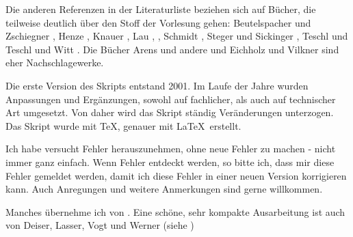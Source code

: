 Die anderen Referenzen in der Literaturliste beziehen sich auf Bücher, die 
teilweise deutlich über den Stoff der Vorlesung gehen: 
Beutelspacher und Zschiegner \cite{Beutelspacher.2002}, 
Henze \cite{Henze.2005}, 
Knauer \cite{Knauer.2001}, 
Lau \cite{Lau.2004}, 
\cite{Lau.2004b}, 
Schmidt \cite{Schmidt.2000}, 
Steger und Sickinger \cite{Steger.2002}, 
Teschl und Teschl \cite{Teschl.2006} und 
Witt \cite{Witt.2001}. 
Die Bücher Arens und andere \cite{Arens.2008} und 
Eichholz und Vilkner \cite{Eichholz.2002} sind eher Nachschlagewerke.

Die erste Version des Skripts entstand 2001. Im Laufe der Jahre wurden 
Anpassungen und Ergänzungen, sowohl auf fachlicher, als auch auf technischer 
Art umgesetzt. Von daher wird das Skript ständig Veränderungen unterzogen. Das 
Skript wurde mit \TeX, genauer mit \LaTeX\ erstellt.

Ich habe versucht Fehler herauszunehmen, ohne neue Fehler zu machen - nicht 
immer ganz einfach. Wenn Fehler entdeckt werden, so bitte ich, dass mir diese 
Fehler gemeldet werden, damit ich diese Fehler in einer neuen Version 
korrigieren kann. Auch Anregungen und weitere Anmerkungen sind gerne 
willkommen. 
\vspace{1cm}


Manches übernehme ich von \cite{Zeh-Marschke.2014}.
Eine schöne, sehr kompakte Ausarbeitung ist auch von Deiser, Lasser, Vogt und 
Werner (siehe \cite{Deiser.Lasser.2016})

